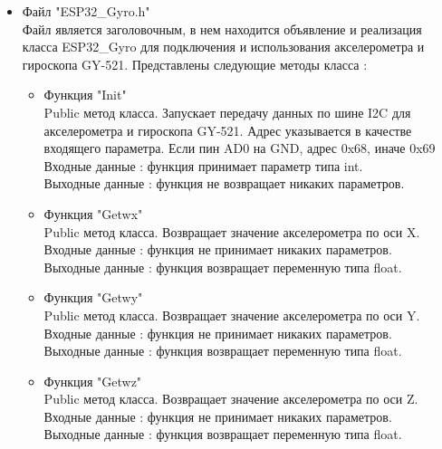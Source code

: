 \documentclass[a4document]{article}
\begin{document}
{\begin{itemize}
    \item Файл "ESP32\_Gyro.h" \\
        Файл является заголовочным, в нем находится объявление и реализация класса ESP32\_Gyro
        для подключения и использования акселерометра и гироскопа GY-521.
        Представлены следующие методы класса : 
        \begin{itemize}
            \item Функция "Init" \\ 
                Public метод класса. Запускает передачу данных по шине I2C для акселерометра и гироскопа GY-521. 
                Адрес указывается в качестве входящего параметра. Если пин AD0 на GND, адрес 0x68, иначе 0x69 \\
                Входные данные : функция принимает параметр типа int. \\
                Выходные данные : функция не возвращает никаких параметров.
            \item Функция "Getwx" \\ 
                Public метод класса. Возвращает значение акселерометра по оси X.\\
                Входные данные : функция не принимает никаких параметров. \\
                Выходные данные : функция возвращает переменную типа float.
            \item Функция "Getwy" \\ 
                Public метод класса. Возвращает значение акселерометра по оси Y.\\
                Входные данные : функция не принимает никаких параметров. \\
                Выходные данные : функция возвращает переменную типа float.
            \newpage
            \item Функция "Getwz" \\ 
                Public метод класса. Возвращает значение акселерометра по оси Z.\\
                Входные данные : функция не принимает никаких параметров. \\
                Выходные данные : функция возвращает переменную типа float.
            

\end{itemize}
\end{itemize}}
\end{document}
